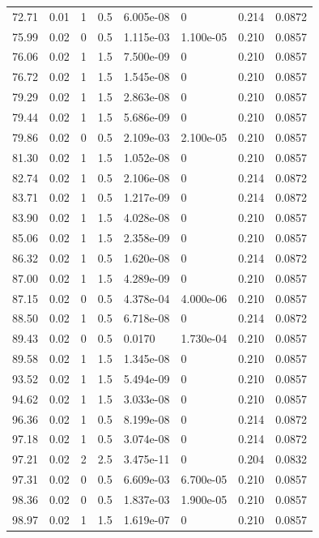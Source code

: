 \documentclass[preview]{standalone}
\begin{document}
{{{\begin{tabular}{L{1.2cm}C{1.2cm} C{0.3cm}C{0.5cm} C{1.4cm}C{1.4cm} C{1.4cm}C{1.4cm}}
  72.71  &  0.01  & 1     & 0.5 &  6.005e-08  & 0  & 0.214 &  0.0872   \\ 
  75.99  &  0.02  & 0     & 0.5 &  1.115e-03  & 1.100e-05  & 0.210 &  0.0857   \\ 
  76.06  &  0.02  & 1     & 1.5 &  7.500e-09  & 0  & 0.210 &  0.0857   \\ 
  76.72  &  0.02  & 1     & 1.5 &  1.545e-08  & 0  & 0.210 &  0.0857   \\ 
  79.29  &  0.02  & 1     & 1.5 &  2.863e-08  & 0  & 0.210 &  0.0857   \\ 
  79.44  &  0.02  & 1     & 1.5 &  5.686e-09  & 0  & 0.210 &  0.0857   \\ 
  79.86  &  0.02  & 0     & 0.5 &  2.109e-03  & 2.100e-05  & 0.210 &  0.0857   \\ 
  81.30  &  0.02  & 1     & 1.5 &  1.052e-08  & 0  & 0.210 &  0.0857   \\ 
  82.74  &  0.02  & 1     & 0.5 &  2.106e-08  & 0  & 0.214 &  0.0872   \\ 
  83.71  &  0.02  & 1     & 0.5 &  1.217e-09  & 0  & 0.214 &  0.0872   \\ 
  83.90  &  0.02  & 1     & 1.5 &  4.028e-08  & 0  & 0.210 &  0.0857   \\ 
  85.06  &  0.02  & 1     & 1.5 &  2.358e-09  & 0  & 0.210 &  0.0857   \\ 
  86.32  &  0.02  & 1     & 0.5 &  1.620e-08  & 0  & 0.214 &  0.0872   \\ 
  87.00  &  0.02  & 1     & 1.5 &  4.289e-09  & 0  & 0.210 &  0.0857   \\ 
  87.15  &  0.02  & 0     & 0.5 &  4.378e-04  & 4.000e-06  & 0.210 &  0.0857   \\ 
  88.50  &  0.02  & 1     & 0.5 &  6.718e-08  & 0  & 0.214 &  0.0872   \\ 
  89.43  &  0.02  & 0     & 0.5 &  0.0170  & 1.730e-04  & 0.210 &  0.0857   \\ 
  89.58  &  0.02  & 1     & 1.5 &  1.345e-08  & 0  & 0.210 &  0.0857   \\ 
  93.52  &  0.02  & 1     & 1.5 &  5.494e-09  & 0  & 0.210 &  0.0857   \\ 
  94.62  &  0.02  & 1     & 1.5 &  3.033e-08  & 0  & 0.210 &  0.0857   \\ 
  96.36  &  0.02  & 1     & 0.5 &  8.199e-08  & 0  & 0.214 &  0.0872   \\ 
  97.18  &  0.02  & 1     & 0.5 &  3.074e-08  & 0  & 0.214 &  0.0872   \\ 
  97.21  &  0.02  & 2     & 2.5 &  3.475e-11  & 0  & 0.204 &  0.0832   \\ 
  97.31  &  0.02  & 0     & 0.5 &  6.609e-03  & 6.700e-05  & 0.210 &  0.0857   \\ 
  98.36  &  0.02  & 0     & 0.5 &  1.837e-03  & 1.900e-05  & 0.210 &  0.0857   \\ 
  98.97  &  0.02  & 1     & 1.5 &  1.619e-07  & 0  & 0.210 &  0.0857   \\ 
\hline 
\end{tabular} 

}}}
\end{document}
